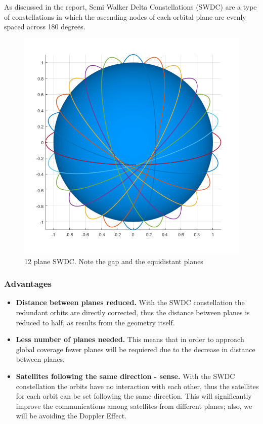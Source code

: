 \label{SemiWalkerDeltaConstellations}
As discussed in the report, Semi Walker Delta Constellations (SWDC) are a type of constellations in which the ascending nodes of each orbital plane are evenly spaced across 180 degrees.

\begin{figure}[h!]
\includegraphics[width=12cm]{semiwalker12vertical}
\centering
\caption{12 plane SWDC. Note the gap and the equidistant planes}
\end{figure}

\subsubsection{Advantages}
\begin{itemize}[label={--}]
\item\textbf{Distance between planes reduced.} With the SWDC constellation the redundant orbits are directly corrected, thus the distance between planes is reduced to half, as results from the geometry itself.
\item\textbf{Less number of planes needed.} This means that in order to approach global coverage fewer planes will be requiered due to the decrease in distance between planes.
\item\textbf{Satellites following the same direction - sense.} With the SWDC constellation the orbits have no interaction with each other, thus the satellites for each orbit can be set following the same direction. This will significantly improve the communications among satellites from different planes; also, we will be avoiding the Doppler Effect.
\end{itemize}

